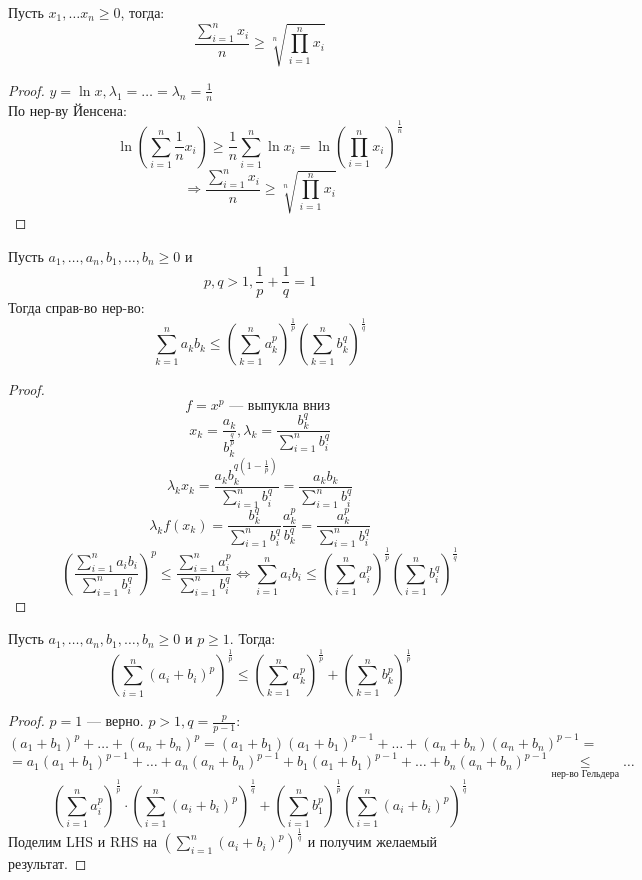 \begin{example}
Пусть $x_1, \ldots x_n \geq 0$, тогда:
\[
  \frac{\sum_{i = 1}^{n} x_i}{n} \geq \sqrt[n]{\prod_{i = 1}^{n} x_i}
\]
\end{example}
\begin{proof}
$y = \ln x, \lambda_1 = \ldots = \lambda_n = \frac{1}{n}$ \\
По нер-ву Йенсена:
\[
\ln\left(\sum_{i = 1}^{n} \frac{1}{n}x_i\right) \geq \frac{1}{n}\sum_{i = 1}^{n} \ln x_i = \ln\left(\prod_{i = 1}^{n} x_i\right)^{\frac{1}{n}}
\]
\[
\Rightarrow \frac{\sum_{i = 1}^{n} x_i}{n} \geq \sqrt[n]{\prod_{i = 1}^{n} x_i}
\]
\end{proof}
\begin{example}
  Пусть $a_1, \ldots, a_n, b_1, \ldots, b_n \geq 0$ и
  \[
    p, q > 1, \frac{1}{p} + \frac{1}{q} = 1
  \]
  Тогда справ-во нер-во:
  \[
  \sum_{k = 1}^{n} a_k b_k \leq \left(\sum_{k = 1}^{n} a_k^{p}\right)^{\frac{1}{p}} \left(\sum_{k = 1}^{n} b_k^{q}\right)^{\frac{1}{q}}
  \]

\end{example}
\begin{proof}
\[
f = x^{p} \text{ --- выпукла вниз }
\]
\[
x_k = \frac{a_k}{b_k^{\frac{q}{p}}}, \lambda_k = \frac{b_k^{q}}{\sum_{i = 1}^{n} b_i^{q}}
\]
\[
  \lambda_k x_k = \frac{a_k b_k^{q\left(1 - \frac{1}{p}\right)}}{\sum_{i = 1}^{n} b_i^{q}} = \frac{a_k b_k}{\sum_{i = 1}^{n} b_i^{q}}
\]
\[
  \lambda_k f(x_k) = \frac{b_k^{q}}{\sum_{i = 1}^{n} b_i^{q}} \frac{a_k^{p}}{b_k^{q}} = \frac{a_k^{p}}{\sum_{i = 1}^{n} b_i^{q}}
\]
\[
  \left(\frac{\sum_{i = 1}^{n} a_i b_i}{\sum_{i = 1}^{n} b_i^{q}}\right)^{p} \leq \frac{\sum_{i = 1}^{n} a_i^{p}}{\sum_{i = 1}^{n}b_i^{q}} \iff \sum_{i = 1}^{n} a_i b_i \leq \left(\sum_{i = 1}^{n} a_i^{p}\right)^{\frac{1}{p}} \left(\sum_{i = 1}^{n} b_i^{q}\right)^{\frac{1}{q}}
\]
\end{proof}
\begin{example}
Пусть $a_1, \ldots, a_n, b_1, \ldots, b_n \geq 0$ и $p \geq 1$. Тогда:
\[
\left(\sum_{i = 1}^{n} (a_i + b_i)^{p}\right)^{\frac{1}{p}} \leq \left(\sum_{k = 1}^{n} a_k^{p}\right)^{\frac{1}{p}} + \left(\sum_{k = 1}^{n} b_k^{p}\right)^{\frac{1}{p}}
\]
\end{example}
\begin{proof}
$p = 1$ --- верно. $p > 1, q = \frac{p}{p- 1}$:
\[
  (a_1 + b_1)^{p} + \ldots + (a_n + b_n)^{p} = (a_1 + b_1)(a_1 + b_1)^{p - 1} + \ldots + (a_n + b_n)(a_n + b_n)^{p - 1} = 
\]
\[
 = a_1 (a_1 + b_1)^{p - 1} + \ldots + a_n(a_n + b_n)^{p - 1} + b_1(a_1 + b_1)^{p - 1} + \ldots + b_n(a_n + b_n)^{p -1} \underset{\text{нер-во Гельдера}}{\leq} \ldots
\]
\[
  \left(\sum_{i = 1}^{n} a_i^{p}\right)^{\frac{1}{p}} \cdot \left(\sum_{i = 1}^{n} (a_i + b_i)^{p}\right)^{\frac{1}{q}} + \left(\sum_{i = 1}^{n} b_1^{p}\right)^{\frac{1}{p}}\left(\sum_{i = 1}^{n} (a_i + b_i)^{p}\right)^{\frac{1}{q}}
\]
Поделим LHS и RHS на $\left(\sum_{i = 1}^{n} (a_i + b_i)^{p}\right)^{\frac{1}{q}}$ и получим желаемый результат.
\end{proof}
